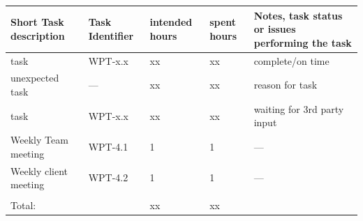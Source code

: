 \documentclass{letter}
\begin{document}
  \begin{tabular}{ m{}  m{}  m{}  m{}  m{}  }
    \large Short Task description & Task Identifier & intended hours & spent hours & Notes, task status or issues performing the task \\
    \hline \hline
    task & WPT-x.x & xx & xx & complete/on time \\
    \hline
    unexpected task & --- & xx & xx & reason for task  \\
    \hline
    task & WPT-x.x & xx & xx & waiting for 3rd party input  \\
    \hline
    Weekly Team meeting & WPT-4.1 & 1 & 1 & --- \\
    \hline
    Weekly client meeting & WPT-4.2 & 1 & 1 & --- \\
    \hline
                                &&&&\\
    Total: & & xx & xx & \\
  \end{tabular}
\end{document}

